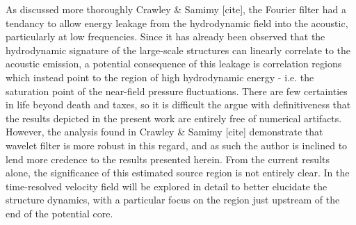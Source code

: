 As discussed more thoroughly Crawley \& Samimy [cite], the Fourier filter had a tendancy to allow energy leakage from the hydrodynamic field into the acoustic, particularly at low frequencies. 
Since it has already been observed that the hydrodynamic signature of the large-scale structures can linearly correlate to the acoustic emission, a potential consequence of this leakage is correlation regions which instead point to the region of high hydrodynamic energy - i.e. the saturation point of the near-field pressure fluctuations.
There are few certainties in life beyond death and taxes, so it is difficult the argue with definitiveness that the results depicted in the present work are entirely free of numerical artifacts.
However, the analysis found in Crawley \& Samimy [cite] demonstrate that wavelet filter is more robust in this regard, and as such the author is inclined to lend more credence to the results presented herein. 
From the current results alone, the significance of this estimated source region is not entirely clear.
In  the time-resolved velocity field will be explored in detail to better elucidate the structure dynamics, with a particular focus on the region just upstream of the end of the potential core.